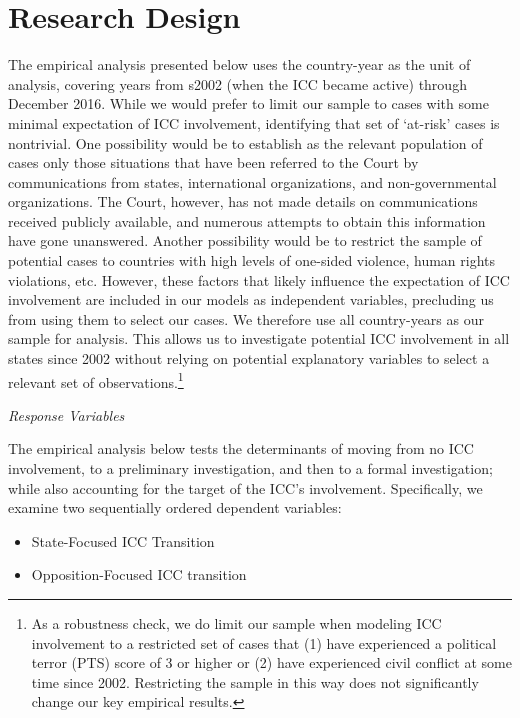 \section*{Research Design}

The empirical analysis presented below uses the country-year as the unit of analysis, covering years from s2002 (when the ICC became active) through December 2016.  While we would prefer to limit our sample to cases with some minimal expectation of ICC involvement, identifying that set of `at-risk' cases is nontrivial. One possibility would be to establish as the relevant population of cases only those situations that have been referred to the Court by communications from states, international organizations, and non-governmental organizations. The Court, however, has not made details on communications received publicly available, and numerous attempts to obtain this information have gone unanswered. Another possibility would be to restrict the sample of potential cases to countries with high levels of one-sided violence, human rights violations, etc. However, these factors that likely influence the expectation of ICC involvement are included in our models as independent variables, precluding us from using them to select our cases. We therefore use all country-years as our sample for analysis. This allows us to investigate potential ICC involvement in all states since 2002 without relying on potential explanatory variables to select a relevant set of observations.\footnote{As a robustness check, we do limit our sample when modeling ICC involvement to a restricted set of cases that (1) have experienced a political terror (PTS) score of 3 or higher or (2) have experienced civil conflict at some time since 2002. Restricting the sample in this way does not significantly change our key empirical results.}

\emph{Response Variables}

The empirical analysis below tests the determinants of moving from no ICC involvement, to a preliminary investigation, and then to a formal investigation; while also accounting for the target of the ICC's involvement. Specifically, we examine two sequentially ordered dependent variables: 

\begin{itemize}
	\item State-Focused ICC Transition
	\item Opposition-Focused ICC transition
\end{itemize}

